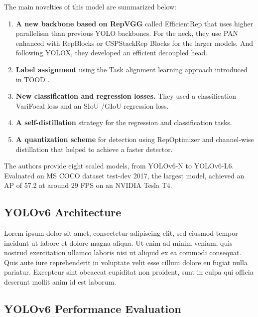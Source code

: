 \documentclass{article}
\begin{document}
The main novelties of this model are summarized below:

\begin{enumerate}
    \item \textbf{A new backbone based on RepVGG} \cite{ding2021repvgg} called EfficientRep that uses higher parallelism than previous YOLO backbones. For the neck, they use PAN \cite{liu2018path} enhanced with RepBlocks \cite{ding2021repvgg} or CSPStackRep \cite{wang2020cspnet} Blocks for the larger models. And following YOLOX, they developed an efficient decoupled head.
    \item \textbf{Label assignment} using the Task alignment learning approach introduced in TOOD \cite{feng2021tood}.
    \item \textbf{New classification and regression losses.} They used a classification VariFocal loss \cite{zhang2021varifocalnet} and an SIoU \cite{gevorgyan2022siou} /GIoU \cite{rezatofighi2019generalized} regression loss.
    \item \textbf{A self-distillation} strategy for the regression and classification tasks.
    \item \textbf{A quantization scheme} for detection using RepOptimizer \cite{ding2022re} and channel-wise distillation \cite{shu2021channel} that helped to achieve a faster detector.
\end{enumerate}


The authors provide eight scaled models, from YOLOv6-N to YOLOv6-L6. Evaluated on MS COCO dataset test-dev 2017, the largest model, achieved an AP of 57.2 at around 29 FPS on an NVIDIA Tesla T4.

\subsection{YOLOv6 Architecture}


Lorem ipsum dolor sit amet, consectetur adipiscing elit, sed eiusmod tempor incidunt ut labore et dolore magna aliqua. Ut enim ad minim veniam, quis nostrud exercitation ullamco laboris nisi ut aliquid ex ea commodi consequat. Quis aute iure reprehenderit in voluptate velit esse cillum dolore eu fugiat nulla pariatur. Excepteur sint obcaecat cupiditat non proident, sunt in culpa qui officia deserunt mollit anim id est laborum.

\subsection{YOLOv6 Performance Evaluation}
\end{document}
